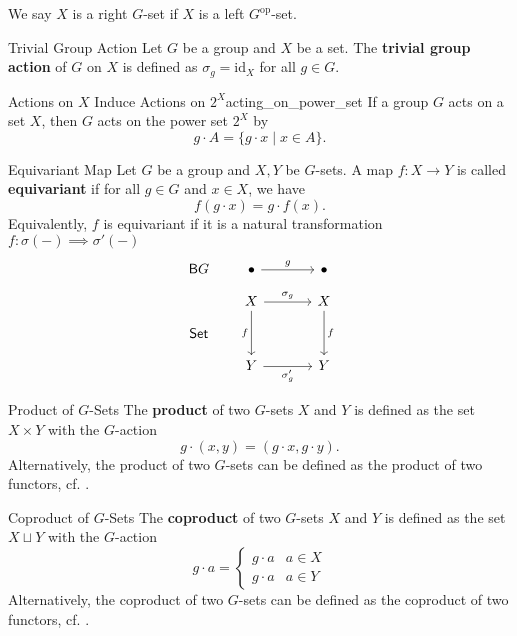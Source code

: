 We say $X$ is a right $G$-set if $X$ is a left $G^{\mathrm{op}}$-set.
\begin{example}{Trivial Group Action}{}
    Let $G$ be a group and $X$ be a set. The \textbf{trivial group action} of $G$ on $X$ is defined as $\sigma_g=\mathrm{id}_X$ for all $g\in G$.
\end{example}

\begin{example}{Actions on $X$ Induce Actions on $2^X$}{acting_on_power_set}
    If a group $G$ acts on a set $X$, then $G$ acts on the power set $2^X$ by
    \[
        g\cdot A=\{ g\cdot x\mid x\in A\}    .
    \]
\end{example}

\begin{definition}{Equivariant Map}{}
    Let $G$ be a group and $X,Y$ be $G$-sets. A map $f:X\to Y$ is called \textbf{equivariant} if for all $g\in G$ and $x\in X$, we have
    \[
        f(g\cdot x)=g\cdot f(x)    .
    \]
    Equivalently, $f$ is equivariant if it is a natural transformation $f:\sigma(-)\implies \sigma'(-)$
    \[
        \begin{tikzcd}[ampersand replacement=\&, column sep=1.7em, row sep=small]
            \mathsf{B}G  \& \bullet \arrow[rr, "g"]                         \&  \& \bullet                 \\
            \& X \arrow[dd, "f"'] \arrow[rr, "\sigma_g"] \&  \& X \arrow[dd, "f"] \\
            \mathsf{Set} \&                                           \&  \&                   \\
            \& Y \arrow[rr, "\sigma'_g"']                \&  \& Y
        \end{tikzcd}
    \]
\end{definition}

\begin{definition}{Product of $G$-Sets}{}
    The \textbf{product} of two $G$-sets $X$ and $Y$ is defined as the set $X\times Y$ with the $G$-action
    \[
        g\cdot (x,y)=(g\cdot x, g\cdot y)    .
    \]
    Alternatively, the product of two $G$-sets can be defined as the product of two functors, cf. .
\end{definition}

\begin{definition}{Coproduct of $G$-Sets}{}
    The \textbf{coproduct} of two $G$-sets $X$ and $Y$ is defined as the set $X\sqcup Y$ with the $G$-action
    \[
        g\cdot a=\begin{cases}
            g\cdot a & a\in X \\
            g\cdot a & a\in Y
        \end{cases}
    \]
    Alternatively, the coproduct of two $G$-sets can be defined as the coproduct of two functors, cf. .
\end{definition}

